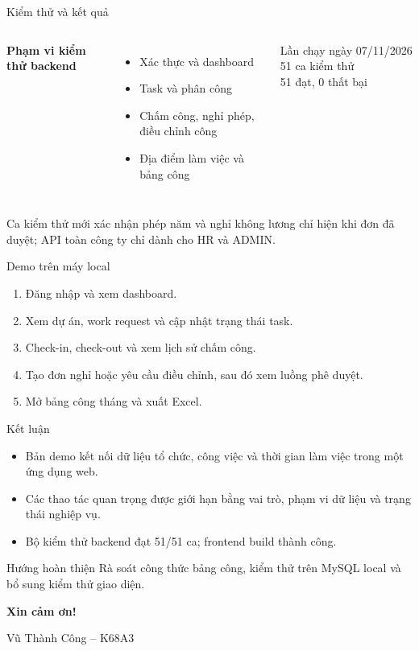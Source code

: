 \documentclass[aspectratio=169,11pt]{beamer}
\begin{document}
\begin{frame}{Kiểm thử và kết quả}
\begin{columns}[T,onlytextwidth]
\textbf{Phạm vi kiểm thử backend}
\begin{itemize}
\item Xác thực và dashboard
\item Task và phân công
\item Chấm công, nghỉ phép, điều chỉnh công
\item Địa điểm làm việc và bảng công
\end{itemize}
\begin{block}{Lần chạy ngày 07/11/2026}
51 ca kiểm thử\\[2mm]
51 đạt, 0 thất bại
\end{block}
\end{columns}
\vspace{4mm}
\small Ca kiểm thử mới xác nhận phép năm và nghỉ không lương chỉ hiện khi đơn đã duyệt; API toàn công ty chỉ dành cho HR và ADMIN.
\end{frame}

\begin{frame}{Demo trên máy local}
\begin{enumerate}
\setlength{\itemsep}{10pt}
\item Đăng nhập và xem dashboard.
\item Xem dự án, work request và cập nhật trạng thái task.
\item Check-in, check-out và xem lịch sử chấm công.
\item Tạo đơn nghỉ hoặc yêu cầu điều chỉnh, sau đó xem luồng phê duyệt.
\item Mở bảng công tháng và xuất Excel.
\end{enumerate}
\end{frame}

\begin{frame}{Kết luận}
\begin{itemize}
\setlength{\itemsep}{10pt}
\item Bản demo kết nối dữ liệu tổ chức, công việc và thời gian làm việc trong một ứng dụng web.
\item Các thao tác quan trọng được giới hạn bằng vai trò, phạm vi dữ liệu và trạng thái nghiệp vụ.
\item Bộ kiểm thử backend đạt 51/51 ca; frontend build thành công.
\end{itemize}
\vspace{6mm}
\begin{block}{Hướng hoàn thiện}
Rà soát công thức bảng công, kiểm thử trên MySQL local và bổ sung kiểm thử giao diện.
\end{block}
\end{frame}

\begin{frame}[plain]
\centering\vfill
{\LARGE\bfseries Xin cảm ơn!}\par\vspace{5mm}
{\large Vũ Thành Công -- K68A3}
\vfill
\end{frame}
\end{document}
